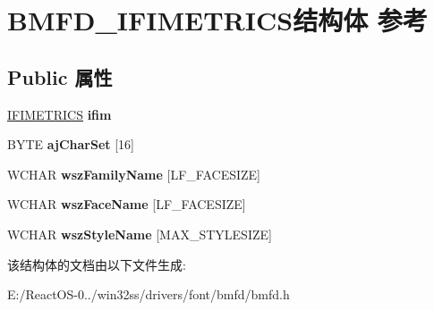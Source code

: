 \hypertarget{struct_b_m_f_d___i_f_i_m_e_t_r_i_c_s}{}\section{B\+M\+F\+D\+\_\+\+I\+F\+I\+M\+E\+T\+R\+I\+C\+S结构体 参考}
\label{struct_b_m_f_d___i_f_i_m_e_t_r_i_c_s}
\subsection*{Public 属性}
\begin{DoxyCompactItemize}
\item 
\mbox{\label{struct_b_m_f_d___i_f_i_m_e_t_r_i_c_s_ac90428c8b2fa1b1e962885334f5964d3}} 
\hyperlink{struct___i_f_i_m_e_t_r_i_c_s}{I\+F\+I\+M\+E\+T\+R\+I\+CS} {\bfseries ifim}
\item 
\mbox{\label{struct_b_m_f_d___i_f_i_m_e_t_r_i_c_s_ad159f53aa6800b9d06bbf43277e8f991}} 
B\+Y\+TE {\bfseries aj\+Char\+Set} \mbox{[}16\mbox{]}
\item 
\mbox{\label{struct_b_m_f_d___i_f_i_m_e_t_r_i_c_s_a0e324b119658de885fa8cd51774756a9}} 
W\+C\+H\+AR {\bfseries wsz\+Family\+Name} \mbox{[}L\+F\+\_\+\+F\+A\+C\+E\+S\+I\+ZE\mbox{]}
\item 
\mbox{\label{struct_b_m_f_d___i_f_i_m_e_t_r_i_c_s_ad7993861c79c1ffbdb78b2c3fde0763d}} 
W\+C\+H\+AR {\bfseries wsz\+Face\+Name} \mbox{[}L\+F\+\_\+\+F\+A\+C\+E\+S\+I\+ZE\mbox{]}
\item 
\mbox{\label{struct_b_m_f_d___i_f_i_m_e_t_r_i_c_s_a1ba5479bec233f60a14ffb698719179a}} 
W\+C\+H\+AR {\bfseries wsz\+Style\+Name} \mbox{[}M\+A\+X\+\_\+\+S\+T\+Y\+L\+E\+S\+I\+ZE\mbox{]}
\end{DoxyCompactItemize}


该结构体的文档由以下文件生成\+:\begin{DoxyCompactItemize}
\item 
E\+:/\+React\+O\+S-\/0../win32ss/drivers/font/bmfd/bmfd.\+h\end{DoxyCompactItemize}
